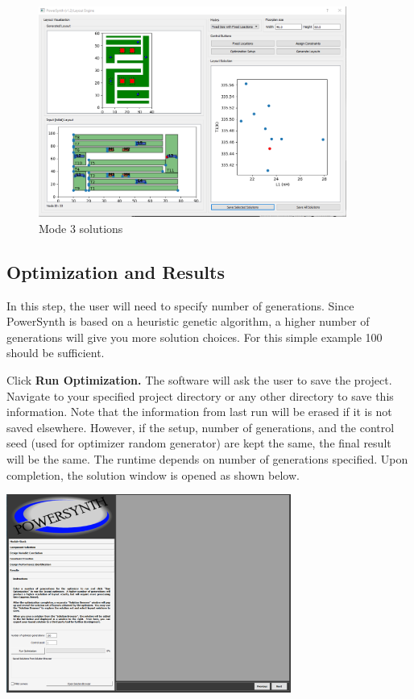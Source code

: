 \documentclass[11pt]{article}
\begin{document}
\begin{itemize}
     \begin{figure}[H]
    \centering
    \includegraphics[width=0.9\textwidth]{./figs/Test/mode_3_result.PNG}
    \caption{Mode 3 solutions}
    \label{mode_3_res}
    \end{figure}
    
    
\end{itemize}

\pagebreak

\subsection{Optimization and Results}
\label{sec-2-6}

In this step, the user will need to specify number of generations. Since PowerSynth is based on a heuristic genetic algorithm, a higher number of generations will give you more solution choices. For this simple example 100 should be sufficient.

Click \textbf{Run Optimization.} The software will ask the user to save the project. Navigate to your specified project directory or any other directory to save this information. Note that the information from last run will be erased if it is not saved elsewhere. However, if the setup, number of generations, and the control seed (used for optimizer random generator) are kept the same, the final result will be the same. The runtime depends on number of generations specified. Upon completion, the solution window is opened as shown below.

\begin{center}
\includegraphics[width=0.7\textwidth]{./figs/26_Optimization.png}
\end{center}
\end{document}
